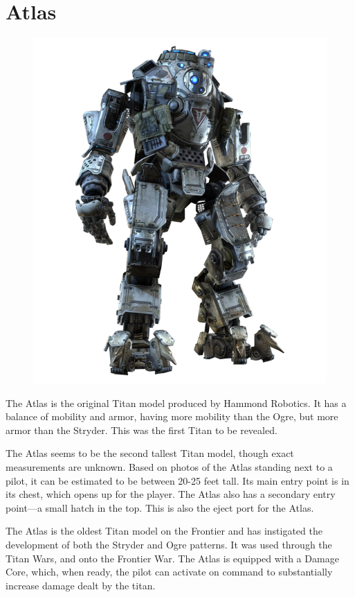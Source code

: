 \documentclass[9pt, openany]{extbook}
\begin{document}
\section{Atlas}
\label{sec:atlas}
\begin{figure}
\includegraphics[width=\linewidth]{Atlas}
\end{figure}


The Atlas is the original Titan model produced by Hammond Robotics. It has a balance of mobility and armor, having more mobility than the Ogre, but more armor than the Stryder. This was the first Titan to be revealed.

The Atlas seems to be the second tallest Titan model, though exact measurements are unknown. Based on photos of the Atlas standing next to a pilot, it can be estimated to be between 20-25 feet tall. Its main entry point is in its chest, which opens up for the player. The Atlas also has a secondary entry point---a small hatch in the top. This is also the eject port for the Atlas.

The Atlas is the oldest Titan model on the Frontier and has instigated the development of both the Stryder and Ogre patterns. It was used through the Titan Wars, and onto the Frontier War. The Atlas is equipped with a Damage Core, which, when ready, the pilot can activate on command to substantially increase damage dealt by the titan.
\end{document}
